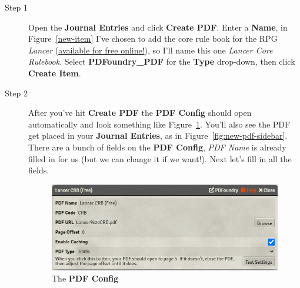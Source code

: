\documentclass{article}
\begin{document}
    \begin{description}
        \item [Step 1] Open the \textbf{Journal Entries} and click \textbf{Create PDF}. Enter a \textbf{Name}, in Figure~\ref{new-item} I've chosen to add the core rule book for the RPG \textit{Lancer} (\href{https://massif-press.itch.io/corebook-pdf-free}{available for free online!}), so I'll name this one \textit{Lancer Core Rulebook}. Select \textbf{PDFoundry\_PDF} for the \textbf{Type} drop-down, then click \textbf{Create Item}.


        \item [Step 2] After you've hit \textbf{Create PDF} the \textbf{PDF Config} should open automatically and look something like Figure~\ref{fig:new-pdf-config}. You'll also see the PDF get placed in your \textbf{Journal Entries}, as in Figure~\ref{fig:new-pdf-sidebar}. There are a bunch of fields on the \textbf{PDF Config}, \textit{PDF Name} is already filled in for us (but we can change it if we want!). Next let's fill in all the fields.

        \begin{figure}[h]
            \centering
            \includegraphics[width=1\textwidth]{images/new-pdf-config.png}
            \caption{The \textbf{PDF Config}}
            \label{fig:new-pdf-config}
        \end{figure}


\end{description}
\end{document}
